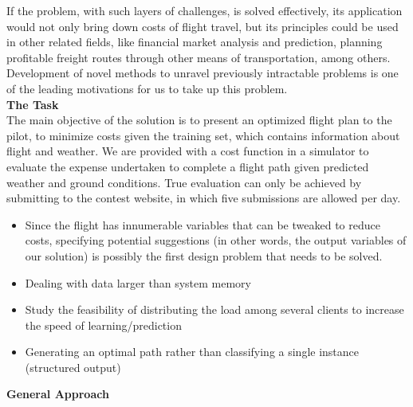 \documentclass{article}[9pt]
\begin{document}
If the problem, with such layers of challenges, is solved effectively, its application would not only bring down costs of flight travel, but its principles could be used in other related fields, like financial market analysis and prediction, planning profitable freight routes through other means of transportation, among others. Development of novel methods to unravel previously intractable problems is one of the leading motivations for us to take up this problem.\\
[\baselineskip]
\noindent
\Large{\textbf{The Task}} \\
\noindent The main objective of the solution is to present an optimized flight plan to the pilot, to minimize costs given the training set, which contains information about flight and weather. We are provided with a cost function in a simulator to evaluate the expense undertaken to complete a flight path given predicted weather and ground conditions. True evaluation can only be achieved by submitting to the contest website, in which five submissions are allowed per day.
\begin{itemize}
	\item Since the flight has innumerable variables that can be tweaked to reduce costs, specifying potential suggestions (in other words, the output variables of our solution) is possibly the first design problem that needs to be solved.
	\item Dealing with data larger than system memory
	\item Study the feasibility of distributing the load among several clients to increase the speed of learning/prediction
	\item Generating an optimal path rather than classifying a single instance (structured output)
\end{itemize}
\noindent
\Large{\textbf{General Approach}}%
\end{document}
